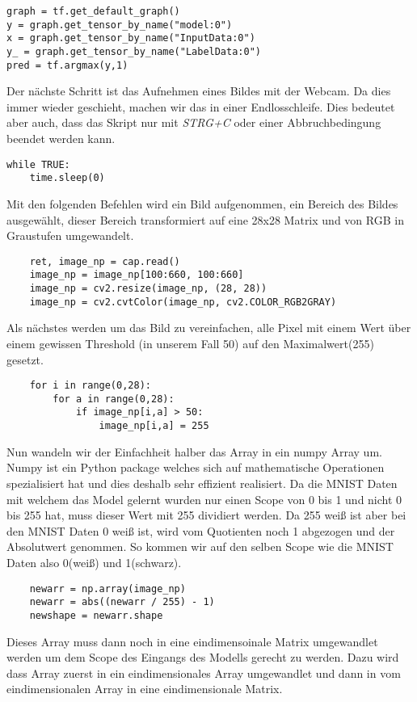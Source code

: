\begin{lstlisting}
graph = tf.get_default_graph()
y = graph.get_tensor_by_name("model:0")
x = graph.get_tensor_by_name("InputData:0")
y_ = graph.get_tensor_by_name("LabelData:0")
pred = tf.argmax(y,1)
\end{lstlisting}
Der nächste Schritt ist das Aufnehmen eines Bildes mit der Webcam. Da dies immer wieder geschieht, machen wir das in einer Endlosschleife. Dies bedeutet aber auch, dass das Skript nur mit \emph{STRG+C} oder einer Abbruchbedingung beendet werden kann.
\begin{lstlisting}
while TRUE:
    time.sleep(0)
\end{lstlisting}
Mit den folgenden Befehlen wird ein Bild aufgenommen, ein Bereich des Bildes ausgewählt, dieser Bereich transformiert auf eine 28x28 Matrix und von RGB in Graustufen umgewandelt.
\begin{lstlisting}
    ret, image_np = cap.read()
    image_np = image_np[100:660, 100:660]
    image_np = cv2.resize(image_np, (28, 28))
    image_np = cv2.cvtColor(image_np, cv2.COLOR_RGB2GRAY)
\end{lstlisting}
Als nächstes werden um das Bild zu vereinfachen, alle Pixel mit einem Wert über einem gewissen Threshold (in unserem Fall 50) auf den Maximalwert(255) gesetzt.
\begin{lstlisting}
    for i in range(0,28):
        for a in range(0,28):
            if image_np[i,a] > 50:
                image_np[i,a] = 255
\end{lstlisting}
Nun wandeln wir der Einfachheit halber das Array in ein numpy Array um. Numpy ist ein Python package welches sich auf mathematische Operationen spezialisiert hat und dies deshalb sehr effizient realisiert.
Da die MNIST Daten mit welchem das Model gelernt wurden nur einen Scope von 0 bis 1 und nicht 0 bis 255 hat, muss dieser Wert mit 255 dividiert werden. Da 255 weiß ist aber bei den MNIST Daten 0 weiß ist, wird vom Quotienten noch 1 abgezogen und der Absolutwert genommen. So kommen wir auf den selben Scope wie die MNIST Daten also 0(weiß) und 1(schwarz).
\begin{lstlisting}
    newarr = np.array(image_np)
    newarr = abs((newarr / 255) - 1)
    newshape = newarr.shape
\end{lstlisting}
Dieses Array muss dann noch in eine eindimensoinale Matrix umgewandlet werden um dem Scope des Eingangs des Modells gerecht zu werden. Dazu wird dass Array zuerst in ein eindimensionales Array umgewandlet und dann in vom eindimensionalen Array in eine eindimensionale Matrix.
